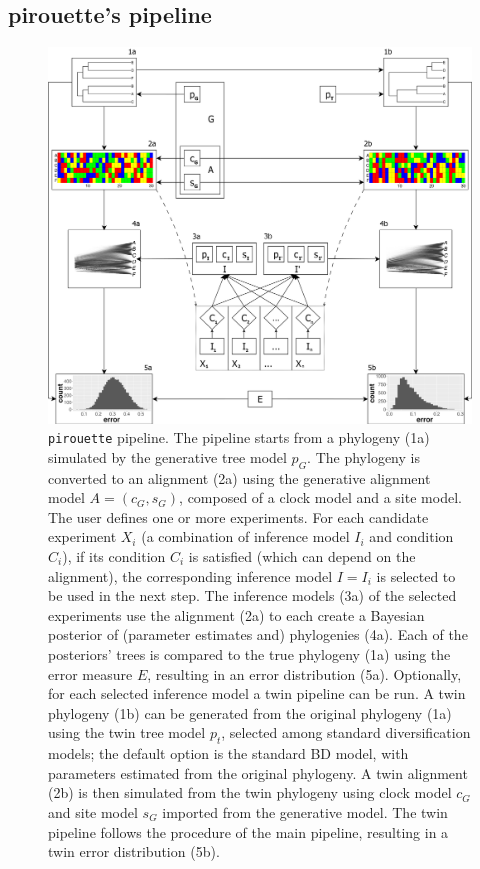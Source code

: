 \subsection{pirouette's pipeline}
\label{subsec:pipeline}

\begin{figure}
  \centering
  \includegraphics[width = \textwidth]{workflow4.png}
  \caption{
    \texttt{pirouette} pipeline.
    The pipeline starts from a phylogeny (1a) simulated by the 
    generative tree model 
    $\mathit{p_{G}}$.
    The phylogeny is converted to an alignment (2a) using the generative 
    alignment model 
    $\mathit{A} = (\mathit{c_{G}}, \mathit{s_{G}})$, composed of a clock model and a site model. 
    The user defines one or more experiments.
    For each candidate experiment $\mathit{X_{i}}$ 
    (a combination of inference model $\mathit{I_{i}}$ and condition $\mathit{C_{i}}$),
    if its condition $\mathit{C_{i}}$ is 
    satisfied (which can depend on the alignment), 
    the corresponding inference model $\mathit{I} = \mathit{I_{i}}$ is selected
    to be used in the next step.
    The inference models (3a) of the selected experiments use the alignment (2a) 
    to each create a Bayesian posterior of (parameter estimates and) 
    phylogenies (4a). 
    Each of the posteriors' trees is compared to the true phylogeny (1a) 
    using the error measure $\mathit{E}$, 
    resulting in an error distribution (5a). 
    Optionally, for each selected inference model a twin pipeline can be run.
    A twin phylogeny (1b) can be generated from the original 
    phylogeny (1a) using the twin tree model $\mathit{p_{t}}$, 
    selected among standard diversification models; 
    the default option is the standard BD model, 
    with parameters estimated from the original phylogeny.
    A twin alignment (2b) is then simulated from the twin phylogeny 
    using clock model $\mathit{c_{G}}$ and site model $\mathit{s_{G}}$ 
    imported from the generative model. 
    The twin pipeline follows the procedure of the main pipeline, 
    resulting in a twin error distribution (5b).
  }
  \label{fig:pipeline}
\end{figure}

